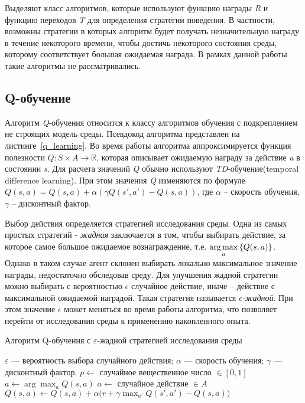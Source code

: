 Выделяют класс алгоритмов, которые используют функцию награды \textit{R} и функцию переходов \textit{T} для определения стратегии поведения. В частности, возможны стратегии в которых алгоритм будет получать незначительную награду в течение некоторого времени, чтобы достичь некоторого состояния среды, которому соответствует большая ожидаемая награда. В рамках данной работы такие алгоритмы не рассматривались.

\subsection{Q-обучение}

Алгоритм \textit{Q}-обучения относится к классу алгоритмов обучения с подкреплением не строящих модель среды. Псевдокод алгоритма представлен на листинге~\ref{q_learning}. Во время работы алгоритма аппроксимируется функция полезности $Q : S \times A \rightarrow \mathbb{R}$, которая описывает ожидаемую награду за действие \textit{a} в состоянии \textit{s}. Для расчета значений \textit{Q} обычно используют \textit{TD}-обучение(temporal difference learning). При этом значения \textit{Q} изменяются по формуле $Q(s, a) = Q(s, a) + \alpha (\gamma Q(s', a') - Q(s, a))$, где $\alpha$ -- скорость обучения, $\gamma$ -- дисконтный фактор.

Выбор действия определяется стратегией исследования среды. Одна из самых простых стратегий - \textit{жадная} заключается в том, чтобы выбирать действие, за которое самое большое ожидаемое вознаграждение, т.е. $\operatorname*{arg\,max}\limits_a{\{Q(s, a)\}}$. Однако в таком случае агент склонен выбирать локально максимальное значение награды, недостаточно обследовав среду. Для улучшения жадной стратегии можно выбирать с вероятностью $\epsilon$ случайное действие, иначе -- действие с максимальной ожидаемой наградой. Такая стратегия называется \textit{$\epsilon$-жадной}. При этом значение $\epsilon$ может меняться во время работы алгоритма, что позволяет перейти от исследования среды к применению накопленного опыта.

\begin{algorithm}[h!]
    \caption{Алгоритм Q-обучения с $\varepsilon$-жадной стратегией исследования среды}
    \label{q_learning}
    \begin{algorithmic}[1]
    \REQUIRE  
        $\varepsilon$ --- вероятность выбора случайного действия;
        $\alpha$ --- скорость обучения;
        $\gamma$ --- дисконтный фактор.
        \STATE $p \gets ${ случайное вещественное число} $\in [0, 1]$
            \STATE $a \gets \arg \max_{a}{Q(s,a)}$
        \ELSE 
            \STATE $a \gets$ { случайное действие } $\in A$
        \ENDIF
        \STATE $Q(s,a) \gets Q(s,a) + \alpha(r + \gamma \max_{a'}{Q(s',a') - Q(s, a))}$
    \ENDWHILE
    \end{algorithmic}
\end{algorithm}

